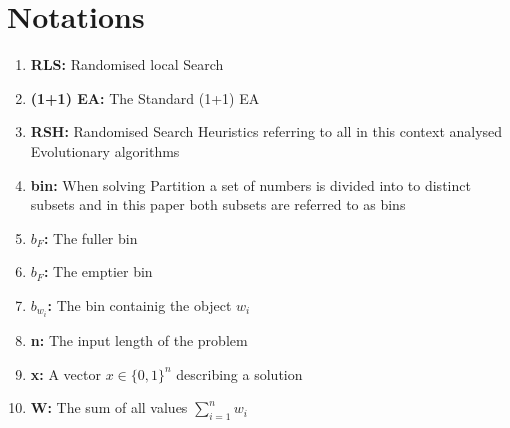 \section{Notations}
\begin{enumerate}
    \item \textbf{RLS:} Randomised local Search
    \item \textbf{(1+1) EA:} The Standard (1+1) EA
    \item \textbf{RSH:} Randomised Search Heuristics referring to all in this context analysed Evolutionary algorithms
    \item \textbf{bin:} When solving Partition a set of numbers is divided into to distinct subsets and in this paper both subsets are referred to as bins
    \item \textbf{$b_F$:} The fuller bin
    \item \textbf{$b_F$:} The emptier bin
    \item \textbf{$b_{w_i}$:} The bin containig the object $w_i$
    \item \textbf{n:} The input length of the problem
    \item \textbf{x:} A vector $x \in {\{0, 1\}}^n$ describing a solution
    \item \textbf{W:} The sum of all values $\sum_{i=1}^{n}w_i$
\end{enumerate}